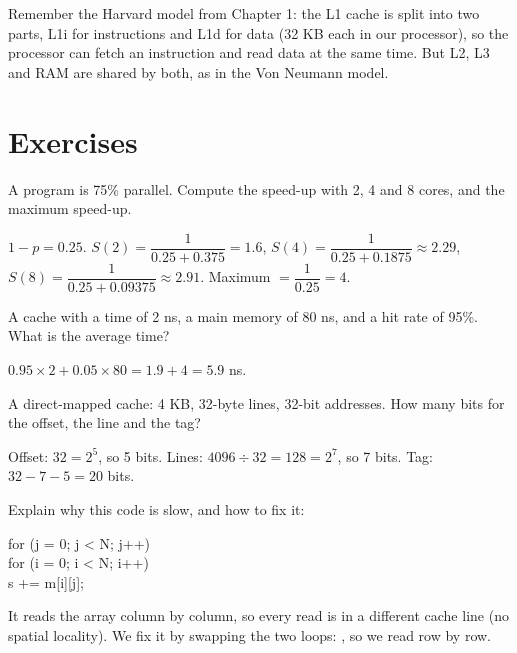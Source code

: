 \begin{hal}
    Remember the Harvard model from Chapter 1: the L1 cache is split into two parts, L1i for instructions and L1d for data
    (32 KB each in our processor), so the processor can fetch an instruction and read data at the same time. But L2, L3 and RAM
    are shared by both, as in the Von Neumann model.
\end{hal}

\section{Exercises}

\begin{tamrin}
    A program is 75\% parallel. Compute the speed-up with 2, 4 and 8 cores, and the maximum speed-up.
\end{tamrin}
\begin{hall}
    $1 - p = 0.25$. \quad $S(2) = \dfrac{1}{0.25 + 0.375} = 1.6$, \quad $S(4) = \dfrac{1}{0.25 + 0.1875} \approx 2.29$,
    \quad $S(8) = \dfrac{1}{0.25 + 0.09375} \approx 2.91$. Maximum $= \dfrac{1}{0.25} = 4$.
\end{hall}

\begin{tamrin}
    A cache with a time of 2 ns, a main memory of 80 ns, and a hit rate of 95\%. What is the average time?
\end{tamrin}
\begin{hall}
    $0.95 \times 2 + 0.05 \times 80 = 1.9 + 4 = 5.9$ ns.
\end{hall}

\begin{tamrin}
    A direct-mapped cache: 4 KB, 32-byte lines, 32-bit addresses. How many bits for the offset, the line and the tag?
\end{tamrin}
\begin{hall}
    Offset: $32 = 2^5$, so 5 bits. Lines: $4096 \div 32 = 128 = 2^7$, so 7 bits. Tag: $32 - 7 - 5 = 20$ bits.
\end{hall}

\begin{tamrin}
    Explain why this code is slow, and how to fix it:
    \begin{codebox}\codefont\small
    for (j = 0; j < N; j++) \\
    \hspace*{2em}for (i = 0; i < N; i++) \\
    \hspace*{4em}s += m[i][j];
    \end{codebox}
\end{tamrin}
\begin{hall}
    It reads the array column by column, so every read is in a different cache line (no spatial locality). We fix it by
    swapping the two loops: , so we read row by row.
\end{hall}

